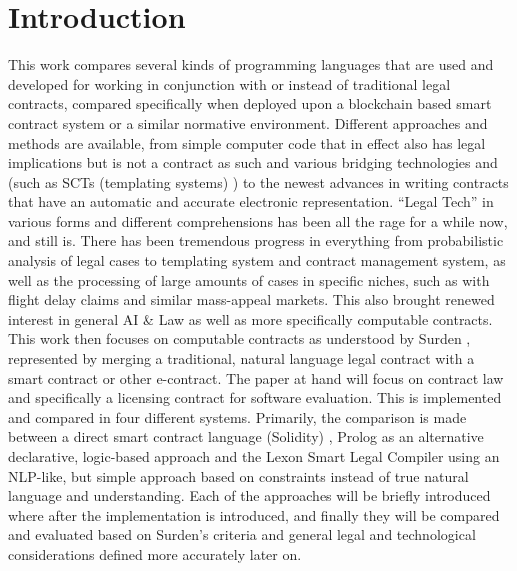 \documentclass[conference]{IEEEtran}
\begin{document}
\section{Introduction}
This work compares several kinds of programming languages that are used and developed for working in conjunction with or instead of traditional legal contracts, compared specifically when deployed upon a blockchain based smart contract system or a similar normative environment.
Different approaches and methods are available, from simple computer code that in effect also has legal implications but is not a contract as such and various bridging technologies and (such as SCTs (templating systems) \cite{wongmengComputableContractsAcademia2018}) to the newest advances in writing contracts that have an automatic and accurate electronic representation.
“Legal Tech” in various forms and different comprehensions has been all the rage for a while now, and still is. \cite{braegelmannRechtshandbuchLegalTech2019} There has been tremendous progress in everything from probabilistic analysis of legal cases to templating system and contract management system, as well as the processing of large amounts of cases in specific niches, such as with flight delay claims and similar mass-appeal markets. This also brought renewed interest in general AI \& Law as well as more specifically computable contracts. This work then focuses on computable contracts as understood by Surden \cite{surdenComputableContracts2012}, represented by merging a traditional, natural language legal contract with a smart contract or other e-contract. %
The paper at hand will focus on contract law and specifically a licensing contract for software evaluation. This is implemented and compared in four different systems. Primarily, the comparison is made between a direct smart contract language (Solidity) \cite{EthereumSolidity2020}, Prolog \cite{bratkoProlog3rdEd2001} as an alternative declarative, logic-based approach and the Lexon Smart Legal Compiler \cite{diedrichLexonBibleHitchhiker2020} using an NLP-like, but simple approach based on constraints instead of true natural language and understanding. %
Each of the approaches will be briefly introduced where after the implementation is introduced, and finally they will be compared and evaluated based on Surden’s criteria and general legal and technological considerations defined more accurately later on. %
\end{document}
